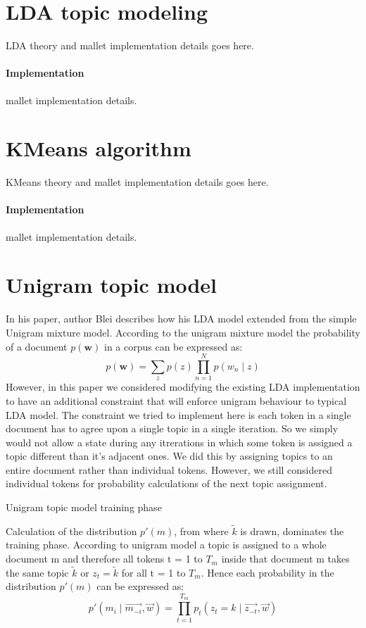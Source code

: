 \section{LDA topic modeling}
\label{sec:lda}
LDA theory and mallet implementation details goes here.
\paragraph{Implementation} mallet implementation details.
\section{KMeans algorithm}
\label{sec:kmeans}
KMeans theory and mallet implementation details goes here.
\paragraph{Implementation} mallet implementation details.
\section{Unigram topic model}
\label{sec:umm}
In his paper, author Blei describes how his LDA model extended from the simple Unigram mixture model. According to the unigram mixture model the probability of a document $p(\mathbf{w})$ in a corpus can be expressed as:
$$ p(\mathbf{w}) = \sum_z p(z) \prod_{n=1}^N p(w_n \mid z)$$
However, in this paper we considered modifying the existing LDA implementation to have an additional constraint that will enforce unigram behaviour to typical LDA model. The constraint we tried to implement here is each token in a single document has to agree upon a single topic in a single iteration. So we simply would not allow a state during any itrerations in which some token is assigned a topic different than it's adjacent ones. We did this by assigning topics to an entire document rather than individual tokens. However, we still considered individual tokens for probability calculations of the next topic assignment.
\begin{algorithm}[htp]
 \caption{Unigram topic model training phase}
\end{algorithm}
Calculation of the distribution $ p'(m)$, from where $ \widetilde{k}$ is drawn, dominates the training phase. According to unigram model a topic is assigned to a whole document m and therefore all tokens t = 1 to $ T_m$ inside that document m takes the same topic $ \widetilde{k}$ or $ z_t = \widetilde{k}$ for all t = 1 to $ T_m$. Hence each probability in the distribution $ p'(m)$ can be expressed as:
$$ p'(m_i \mid \overrightarrow{m_{-i}}, \overrightarrow{w}) =
   \prod_{t=1}^{T_m} p_t(z_t = k \mid \overrightarrow{z_{-t}}, \overrightarrow{w}) $$

